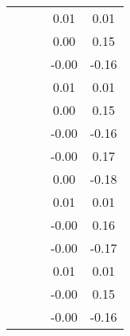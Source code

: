 \begin{table}
\begin{tabular}{c|cc|cc|}
\multicolumn{1}{|c|}{} & \multicolumn{1}{|c|}{} & \multicolumn{1}{|c|}{} & \multicolumn{1}{|c|}{      0.01} & \multicolumn{1}{|c|}{      0.01} \\ 
\multicolumn{1}{|c|}{} & \multicolumn{1}{|c|}{} & \multicolumn{1}{|c|}{} & \multicolumn{1}{|c|}{      0.00} & \multicolumn{1}{|c|}{      0.15} \\ 
\multicolumn{1}{|c|}{} & \multicolumn{1}{|c|}{} & \multicolumn{1}{|c|}{} & \multicolumn{1}{|c|}{     -0.00} & \multicolumn{1}{|c|}{     -0.16} \\ 
\multicolumn{1}{|c|}{} & \multicolumn{1}{|c|}{} & \multicolumn{1}{|c|}{} & \multicolumn{1}{|c|}{      0.01} & \multicolumn{1}{|c|}{      0.01} \\ 
\multicolumn{1}{|c|}{} & \multicolumn{1}{|c|}{} & \multicolumn{1}{|c|}{} & \multicolumn{1}{|c|}{      0.00} & \multicolumn{1}{|c|}{      0.15} \\ 
\multicolumn{1}{|c|}{} & \multicolumn{1}{|c|}{} & \multicolumn{1}{|c|}{} & \multicolumn{1}{|c|}{     -0.00} & \multicolumn{1}{|c|}{     -0.16} \\ 
\multicolumn{1}{|c|}{} & \multicolumn{1}{|c|}{} & \multicolumn{1}{|c|}{} & \multicolumn{1}{|c|}{     -0.00} & \multicolumn{1}{|c|}{      0.17} \\ 
\multicolumn{1}{|c|}{} & \multicolumn{1}{|c|}{} & \multicolumn{1}{|c|}{} & \multicolumn{1}{|c|}{      0.00} & \multicolumn{1}{|c|}{     -0.18} \\ 
\multicolumn{1}{|c|}{} & \multicolumn{1}{|c|}{} & \multicolumn{1}{|c|}{} & \multicolumn{1}{|c|}{      0.01} & \multicolumn{1}{|c|}{      0.01} \\ 
\multicolumn{1}{|c|}{} & \multicolumn{1}{|c|}{} & \multicolumn{1}{|c|}{} & \multicolumn{1}{|c|}{     -0.00} & \multicolumn{1}{|c|}{      0.16} \\ 
\multicolumn{1}{|c|}{} & \multicolumn{1}{|c|}{} & \multicolumn{1}{|c|}{} & \multicolumn{1}{|c|}{     -0.00} & \multicolumn{1}{|c|}{     -0.17} \\ 
\multicolumn{1}{|c|}{} & \multicolumn{1}{|c|}{} & \multicolumn{1}{|c|}{} & \multicolumn{1}{|c|}{      0.01} & \multicolumn{1}{|c|}{      0.01} \\ 
\multicolumn{1}{|c|}{} & \multicolumn{1}{|c|}{} & \multicolumn{1}{|c|}{} & \multicolumn{1}{|c|}{     -0.00} & \multicolumn{1}{|c|}{      0.15} \\ 
\multicolumn{1}{|c|}{} & \multicolumn{1}{|c|}{} & \multicolumn{1}{|c|}{} & \multicolumn{1}{|c|}{     -0.00} & \multicolumn{1}{|c|}{     -0.16} \\ 

\end{tabular}
\end{table}
